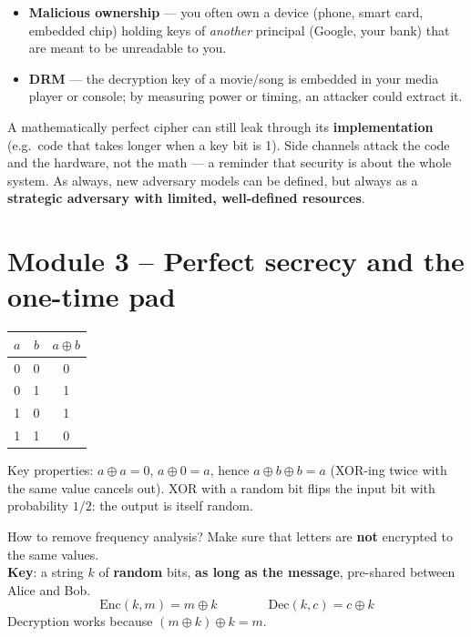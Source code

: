 \begin{propbox}[title=Why are side channels realistic?]
\begin{itemize}
  \item \textbf{Malicious ownership} --- you often own a device (phone, smart card,
        embedded chip) holding keys of \emph{another} principal (Google, your bank) that
        are meant to be unreadable to you.
  \item \textbf{DRM} --- the decryption key of a movie/song is embedded in your media
        player or console; by measuring power or timing, an attacker could extract it.
\end{itemize}
\end{propbox}

\begin{rembox}[title=Algorithm vs.\ implementation]
A mathematically perfect cipher can still leak through its \textbf{implementation}
(e.g.\ code that takes longer when a key bit is 1). Side channels attack the code and
the hardware, not the math --- a reminder that security is about the whole system. As
always, new adversary models can be defined, but always as a \textbf{strategic adversary
with limited, well-defined resources}.
\end{rembox}

\section{Module 3 -- Perfect secrecy and the one-time pad}

\begin{rembox}[title={Reminder: XOR ($\oplus$)}]
\begin{center}
\begin{tabular}{cc|c}
$a$ & $b$ & $a \oplus b$ \\ \hline
0 & 0 & 0 \\ 0 & 1 & 1 \\ 1 & 0 & 1 \\ 1 & 1 & 0
\end{tabular}
\end{center}
Key properties: $a \oplus a = 0$, $a \oplus 0 = a$, hence $a \oplus b \oplus b = a$
(XOR-ing twice with the same value cancels out). XOR with a random bit flips the input
bit with probability $1/2$: the output is itself random.
\end{rembox}

\begin{defnbox}[title=One-Time Pad (OTP)]
How to remove frequency analysis? Make sure that letters are \textbf{not} encrypted to
the same values. \\
\textbf{Key}: a string $k$ of \textbf{random} bits, \textbf{as long as the message},
pre-shared between Alice and Bob.
\[
  \mathrm{Enc}(k, m) = m \oplus k \qquad\qquad \mathrm{Dec}(k, c) = c \oplus k
\]
Decryption works because $(m \oplus k) \oplus k = m$.
\end{defnbox}

